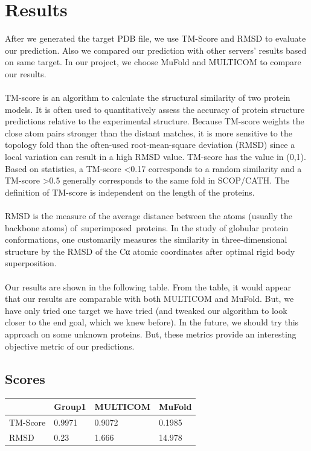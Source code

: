 \documentclass{article}
\begin{document}
\section{Results}

After we generated the target PDB file, we use TM-Score and RMSD to evaluate our prediction. Also we compared our prediction with other servers’ results based on same target. In our project, we choose MuFold and MULTICOM to compare our results.\\\\
TM-score is an algorithm to calculate the structural similarity of two protein models. It is often used to quantitatively assess the accuracy of protein structure predictions relative to the experimental structure. Because TM-score weights the close atom pairs stronger than the distant matches, it is more sensitive to the topology fold than the often-used root-mean-square deviation (RMSD) since a local variation can result in a high RMSD value. TM-score has the value in (0,1). Based on statistics, a TM-score \textless0.17 corresponds to a random similarity and a TM-score \textgreater0.5 generally corresponds to the same fold in SCOP/CATH. The definition of TM-score is independent on the length of the proteins.\\\\
RMSD is the measure of the average distance between the atoms (usually the backbone atoms) of superimposed proteins. In the study of globular protein conformations, one customarily measures the similarity in three-dimensional structure by the RMSD of the Cα atomic coordinates after optimal rigid body superposition.\\\\
Our results are shown in the following table. From the table, it would appear that our results are comparable with both MULTICOM and MuFold. But, we have only tried one target we have tried (and tweaked our algorithm to look closer to the end goal, which we knew before). In the future, we should try this approach on some unknown proteins.  But, these metrics provide an interesting objective metric of our predictions.

\subsection{Scores}
\begin{center}
    \begin{tabular}{ | l | l | l | p{2cm} |}
    \hline
      & Group1 & MULTICOM & MuFold \\ \hline
    TM-Score & 0.9971 & 0.9072 & 0.1985 \\ \hline
    RMSD & 0.23 & 1.666 & 14.978 \\
    \hline
    \end{tabular}
\end{center}
\end{document}
